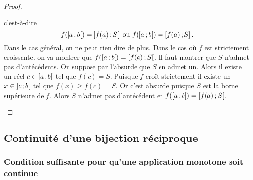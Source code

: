 \begin{proof}
\begin{enumerate}
    c'est-à-dire
    \begin{equation}
      f(\left[ a \, ;  b \right[) = \left[ f(a) \, ;  S \right[ \text{~ou~} f(\left[ a \, ;  b \right[) = \left[ f(a) \, ;  S \right].
    \end{equation}
    Dans le cas général, on ne peut rien dire de plus. Dans le cas où \(f\) est strictement croissante, on va montrer que \(f(\left[ a \, ;  b \right[) = \left[ f(a) \, ;  S \right[\). Il faut montrer que \(S\) n'admet pas d'antécédents. On suppose par l'absurde que \(S\) en admet un. Alors il existe un réel \(c \in \left[ a \, ;  b \right[\) tel que \(f(c)=S\). Puisque \(f\) croît strictement il existe un \(x \in \left] c \, ;  b \right[\) tel que \(f(x) \geqslant f(c)=S\). Or c'est absurde puisque \(S\) est la borne supérieure de \(f\). Alors \(S\) n'admet pas d'antécédent et \(f(\left[ a \, ;  b \right[) = \left[ f(a) \, ;  S \right[\).
  \end{enumerate}
\end{proof}

\subsection{Continuité d'une bijection réciproque}

\subsubsection[Pour qu'une application monotone soit continue]{Condition suffisante pour qu'une application monotone soit continue}

